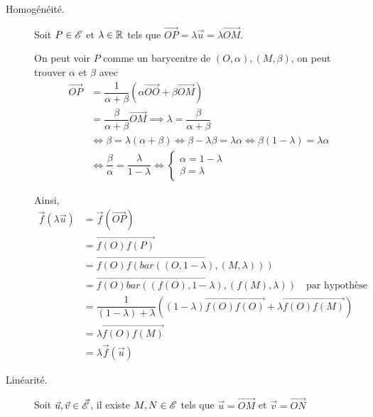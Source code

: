 \documentclass[a4paper, 12pt]{article}
\begin{document}
\begin{demonstration}
\begin{description}
        \begin{description}
            \item[Homogénéité.] %
            Soit $P \in \mathscr{E}$ et $\lambda \in \mathbb{R}$ tels que $\overrightarrow{OP} = \lambda \vec{u} = \lambda \overrightarrow{OM}$.
            
            On peut voir $P$ comme un barycentre de $(O, \alpha), (M, \beta)$, on peut trouver $\alpha$ et $\beta$ avec
            \begin{align*}
                \overrightarrow{OP} &= \dfrac{1}{\alpha + \beta} (\alpha \overrightarrow{OO} + \beta \overrightarrow{OM}) \\
                &= \dfrac{\beta}{\alpha + \beta} \overrightarrow{OM} \implies \lambda = \dfrac{\beta}{\alpha + \beta} \\
                &\iff \beta = \lambda (\alpha + \beta) \iff \beta - \lambda \beta = \lambda \alpha \iff \beta (1 - \lambda) = \lambda \alpha \\
                &\iff \dfrac{\beta}{\alpha} = \dfrac{\lambda}{1 - \lambda} \iff \begin{cases}
                    \alpha = 1 - \lambda \\
                    \beta = \lambda
                \end{cases}
            \end{align*}

            Ainsi,
            \begin{align*}
                \vec{f}(\lambda \vec{u}) &= \vec{f}(\overrightarrow{OP}) \\
                &= \overrightarrow{f(O) f(P)} \\
                &= \overrightarrow{f(O) f(bar((O, 1 - \lambda), (M, \lambda)))} \\
                &= \overrightarrow{f(O) bar((f(O), 1 - \lambda), (f(M), \lambda))} \quad \text{par hypothèse} \\
                &= \dfrac{1}{(1 - \lambda) + \lambda} ((1 - \lambda) \overrightarrow{f(O) f(O)} + \lambda \overrightarrow{f(O) f(M)}) \\
                &= \lambda \overrightarrow{f(O) f(M)} \\
                &= \lambda \vec{f}(\vec{u})
            \end{align*}

            \item[Linéarité.] %
            Soit $\vec{u}, \vec{v} \in \vec{\mathscr{E}}$, il existe $M, N \in \mathscr{E}$ tels que $\vec{u} = \overrightarrow{OM}$ et $\vec{v} = \overrightarrow{ON}$


\end{description}
\end{description}
\end{demonstration}
\end{document}
